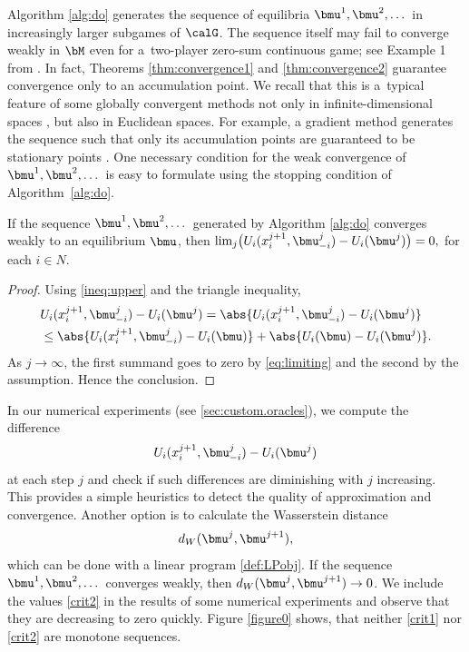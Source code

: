 Algorithm \ref{alg:do} generates the sequence of equilibria $\bmu^1,\bmu^2,\dots$ in increasingly larger subgames of $\calG$. The sequence itself may fail to converge weakly in $\bM$ even for a~two-player zero-sum continuous game; see Example 1 from \cite{Adam21}. In fact, Theorems \ref{thm:convergence1} and \ref{thm:convergence2} guarantee convergence only to an accumulation point. We recall that this is a~typical feature of some globally convergent methods not only in infinite-dimensional spaces \cite[Theorem 2.2]{Hinze08}, but also in Euclidean spaces. For example, a gradient method generates the sequence such that only its accumulation points are guaranteed to be stationary points \cite[Proposition 1.2.1]{Bertsekas16}. One necessary condition for the weak convergence of $\bmu^1,\bmu^2,\dots$ is easy to formulate using the stopping condition of Algorithm~\ref{alg:do}.
\begin{proposition}
  	If the sequence $\bmu^1,\bmu^2,\dots$ generated by Algorithm \ref{alg:do} converges weakly to an equilibrium $\bmu$, then $\lim_j \bigl(U_i(x_i^{j+1},\bmu_{-i}^j)-U_i(\bmu^j)\bigr)=0,$ for each $i\in N.$
\end{proposition}
\begin{proof}
	Using \eqref{ineq:upper} and the triangle inequality,
	\begin{align*}
		&U_i(x_i^{j+1},\bmu_{-i}^j)-U_i(\bmu^j)=\abs{U_i(x_i^{j+1},\bmu_{-i}^j)-U_i(\bmu^j)} \\
		&\leq \abs{U_i(x_i^{j+1},\bmu_{-i}^j)-U_i(\bmu)} + \abs{U_i(\bmu)-U_i(\bmu^j)}.
	\end{align*}
	As $j\to \infty$, the first summand goes to zero by \eqref{eq:limiting} and the second by the assumption. Hence the conclusion.
\end{proof}

In our numerical experiments (see \cref{sec:custom.oracles}), we compute the difference
\begin{equation}\label{crit1}
	U_i(x_i^{j+1},\bmu_{-i}^j)-U_i(\bmu^j)
\end{equation}
at each step $j$ and check if such differences are diminishing with $j$ increasing. This provides a simple heuristics to detect the quality of approximation and convergence. Another option is to calculate the Wasserstein distance
\begin{equation}\label{crit2}
	d_W(\bmu^j,\bmu^{j+1}),
\end{equation}
which can be done with a linear program \eqref{def:LPobj}. If the sequence $\bmu^1,\bmu^2,\dots$ converges weakly, then $d_W(\bmu^j,\bmu^{j+1}) \to 0$. We include the values \eqref{crit2} in the results of some numerical experiments and observe that they are decreasing to zero quickly. Figure \ref{figure0} shows, that neither \eqref{crit1} nor \eqref{crit2} are monotone sequences.




